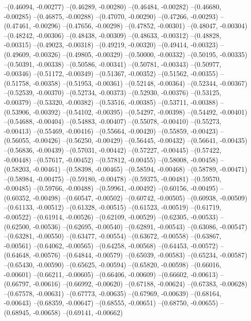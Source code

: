 --(0.46094, -0.00277)
--(0.46289, -0.00280)
--(0.46484, -0.00282)
--(0.46680, -0.00285)
--(0.46875, -0.00288)
--(0.47070, -0.00290)
--(0.47266, -0.00293)
--(0.47461, -0.00296)
--(0.47656, -0.00298)
--(0.47852, -0.00301)
--(0.48047, -0.00304)
--(0.48242, -0.00306)
--(0.48438, -0.00309)
--(0.48633, -0.00312)
--(0.48828, -0.00315)
--(0.49023, -0.00318)
--(0.49219, -0.00320)
--(0.49414, -0.00323)
--(0.49609, -0.00326)
--(0.49805, -0.00329)
--(0.50000, -0.00332)
--(0.50195, -0.00335)
--(0.50391, -0.00338)
--(0.50586, -0.00341)
--(0.50781, -0.00343)
--(0.50977, -0.00346)
--(0.51172, -0.00349)
--(0.51367, -0.00352)
--(0.51562, -0.00355)
--(0.51758, -0.00358)
--(0.51953, -0.00361)
--(0.52148, -0.00364)
--(0.52344, -0.00367)
--(0.52539, -0.00370)
--(0.52734, -0.00373)
--(0.52930, -0.00376)
--(0.53125, -0.00379)
--(0.53320, -0.00382)
--(0.53516, -0.00385)
--(0.53711, -0.00388)
--(0.53906, -0.00392)
--(0.54102, -0.00395)
--(0.54297, -0.00398)
--(0.54492, -0.00401)
--(0.54688, -0.00404)
--(0.54883, -0.00407)
--(0.55078, -0.00410)
--(0.55273, -0.00413)
--(0.55469, -0.00416)
--(0.55664, -0.00420)
--(0.55859, -0.00423)
--(0.56055, -0.00426)
--(0.56250, -0.00429)
--(0.56445, -0.00432)
--(0.56641, -0.00435)
--(0.56836, -0.00439)
--(0.57031, -0.00442)
--(0.57227, -0.00445)
--(0.57422, -0.00448)
--(0.57617, -0.00452)
--(0.57812, -0.00455)
--(0.58008, -0.00458)
--(0.58203, -0.00461)
--(0.58398, -0.00465)
--(0.58594, -0.00468)
--(0.58789, -0.00471)
--(0.58984, -0.00475)
--(0.59180, -0.00478)
--(0.59375, -0.00481)
--(0.59570, -0.00485)
--(0.59766, -0.00488)
--(0.59961, -0.00492)
--(0.60156, -0.00495)
--(0.60352, -0.00498)
--(0.60547, -0.00502)
--(0.60742, -0.00505)
--(0.60938, -0.00509)
--(0.61133, -0.00512)
--(0.61328, -0.00515)
--(0.61523, -0.00519)
--(0.61719, -0.00522)
--(0.61914, -0.00526)
--(0.62109, -0.00529)
--(0.62305, -0.00533)
--(0.62500, -0.00536)
--(0.62695, -0.00540)
--(0.62891, -0.00543)
--(0.63086, -0.00547)
--(0.63281, -0.00550)
--(0.63477, -0.00554)
--(0.63672, -0.00558)
--(0.63867, -0.00561)
--(0.64062, -0.00565)
--(0.64258, -0.00568)
--(0.64453, -0.00572)
--(0.64648, -0.00576)
--(0.64844, -0.00579)
--(0.65039, -0.00583)
--(0.65234, -0.00587)
--(0.65430, -0.00590)
--(0.65625, -0.00594)
--(0.65820, -0.00598)
--(0.66016, -0.00601)
--(0.66211, -0.00605)
--(0.66406, -0.00609)
--(0.66602, -0.00613)
--(0.66797, -0.00616)
--(0.66992, -0.00620)
--(0.67188, -0.00624)
--(0.67383, -0.00628)
--(0.67578, -0.00631)
--(0.67773, -0.00635)
--(0.67969, -0.00639)
--(0.68164, -0.00643)
--(0.68359, -0.00647)
--(0.68555, -0.00651)
--(0.68750, -0.00655)
--(0.68945, -0.00658)
--(0.69141, -0.00662)
